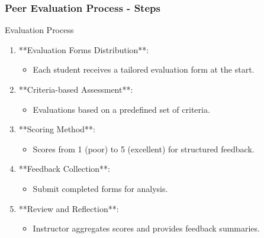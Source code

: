 \documentclass[aspectratio=169]{beamer}
\begin{document}
\begin{frame}[fragile]
  \frametitle{Peer Evaluation Process - Steps}
  \begin{block}{Evaluation Process}
    \begin{enumerate}
      \item **Evaluation Forms Distribution**:
        \begin{itemize}
          \item Each student receives a tailored evaluation form at the start.
        \end{itemize}
      \item **Criteria-based Assessment**:
        \begin{itemize}
          \item Evaluations based on a predefined set of criteria.
        \end{itemize}
      \item **Scoring Method**:
        \begin{itemize}
          \item Scores from 1 (poor) to 5 (excellent) for structured feedback.
        \end{itemize}
      \item **Feedback Collection**:
        \begin{itemize}
          \item Submit completed forms for analysis.
        \end{itemize}
      \item **Review and Reflection**:
        \begin{itemize}
          \item Instructor aggregates scores and provides feedback summaries.
        \end{itemize}
    \end{enumerate}
  \end{block}
\end{frame}
\end{document}
